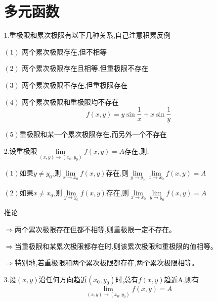 \documentclass{ctexart}
\begin{document}
\newpage
\section{多元函数}
    1.重极限和累次极限有以下几种关系,自己注意积累反例
    
     $\left(1\right)$	两个累次极限存在,但不相等
     
     $\left(2\right)$   两个累次极限存在且相等,但重极限不存在 
     
     $\left(3\right)$   两个累次极限不存在,但重极限存在
     
     $\left(4\right)$   两个累次极限和重极限均不存在
      $$f(x,y)=y \sin \frac{1}{x}+x \sin \frac{1}{y}$$ 
     
     $\left(5\right)$重极限和某一个累次极限存在,而另外一个不存在
     
    2.设重极限$\lim\limits_{\left(x,y \right) \to \left(x_{0},y_{0} \right)}f(x,y)=A$存在,则:
    
    $\left(1\right)$如果$y \ne y_{0}$,则$\lim\limits_{x \to x_{0}}f(x,y)$存在,则$\lim\limits_{y \to y_{0}}\lim\limits_{x \to x_{0}}f(x,y)=A$
    
     $\left(2\right)$如果$x \ne x_{0}$,则$\lim\limits_{y \to y_{0}}f(x,y)$存在,则$\lim\limits_{x \to x_{0}}\lim\limits_{y \to y_{0}}f(x,y)=A$
     
     {\color{red}推论}
     
     $\Rightarrow$两个累次极限存在但都不相等,则重极限一定不存在。
     
     $\Rightarrow$当重极限和某累次极限都存在时,则该累次极限和重极限的值相等。
     
     $\Rightarrow$特别地,若重极限和两个累次极限都存在,两个累次极限相等。
     
     3.设$\left(x,y\right) $沿任何方向趋近$\left(x_{0},y_{0} \right) $时,总有$f(x,y)$趋近A,则有$$\lim\limits_{(x,y) \to (x_{0},y_{0})}f(x,y)=A$$
     
\end{document}
